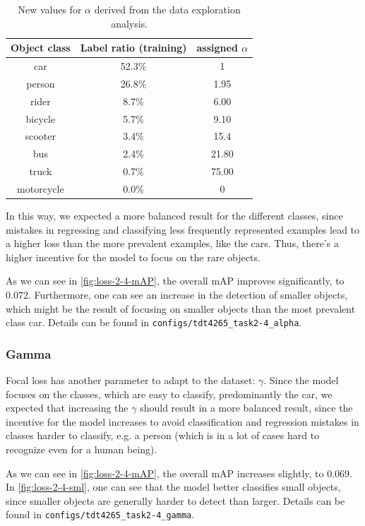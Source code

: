 \documentclass{article}
\begin{document}
\begin{table}[h!]
    \centering
    \begin{tabular}{c|c|c}
    Object class & Label ratio (training) & assigned $\alpha$\\
    \hline
    car & 52.3\% & 1\\
    person & 26.8\% & 1.95\\
    rider & 8.7\% & 6.00 \\
    bicycle & 5.7\% & 9.10 \\
    scooter & 3.4\% & 15.4 \\
    bus & 2.4\% & 21.80 \\
    truck & 0.7\% & 75.00 \\
    motorcycle & 0.0\% & 0 \\
    \end{tabular}
    \caption{New values for $\alpha$ derived from the data exploration analysis.}
    \label{tab:alpha}
\end{table}

In this way, we expected a more balanced result for the different classes, since mistakes in regressing and classifying less frequently represented examples lead to a higher loss than the more prevalent examples, like the cars. Thus, there's a higher incentive for the model to focus on the rare objects.

As we can see in \ref{fig:loss-2-4-mAP}, the overall mAP improves significantly, to 0.072. Furthermore, one can see an increase in the detection of smaller objects, which might be the result of focusing on smaller objects than the most prevalent class car. Details can be found in \texttt{configs/tdt4265\_task2-4\_alpha}.

\subsubsection*{Gamma}

Focal loss has another parameter to adapt to the dataset: $\gamma$. Since the model focuses on the classes, which are easy to classify, predominantly the car, we expected that increasing the $\gamma$ should result in a more balanced result, since the incentive for the model increases to avoid classification and regression mistakes in classes harder to classify, e.g. a person (which is in a lot of cases hard to recognize even for a human being).

As we can see in \ref{fig:loss-2-4-mAP}, the overall mAP increases slightly, to 0.069. In \ref{fig:loss-2-4-sml}, one can see that the model better classifies small objects, since smaller objects are generally harder to detect than larger. Details can be found in \texttt{configs/tdt4265\_task2-4\_gamma}.
\end{document}
